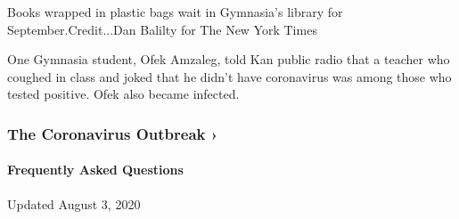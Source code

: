 Books wrapped in plastic bags wait in Gymnasia's library for
September.Credit...Dan Balilty for The New York Times

One Gymnasia student, Ofek Amzaleg, told Kan public radio that a teacher
who coughed in class and joked that he didn't have coronavirus was among
those who tested positive. Ofek also became infected.

\href{https://www.nytimes3xbfgragh.onion/news-event/coronavirus?action=click\&pgtype=Article\&state=default\&region=MAIN_CONTENT_3\&context=storylines_faq}{}

\hypertarget{the-coronavirus-outbreak-}{%
\subsubsection{The Coronavirus Outbreak
›}\label{the-coronavirus-outbreak-}}

\hypertarget{frequently-asked-questions}{%
\paragraph{Frequently Asked
Questions}\label{frequently-asked-questions}}

Updated August 3, 2020

